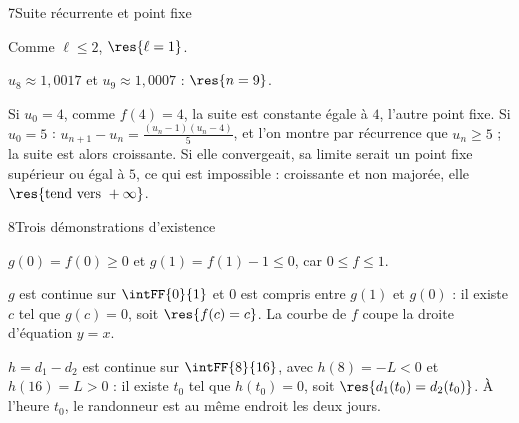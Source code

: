 \begin{corrige}{7}{Suite récurrente et point fixe}
\begin{questions}[start=5]
    Comme $\ell\leq2$, $\res{\ell=1}$.
  \item $u_8\approx1{,}0017$ et $u_9\approx1{,}0007$ : $\res{n=9}$.
  \item Si $u_0=4$, comme $f(4)=4$, la suite est constante égale à $4$, l'autre point fixe. Si $u_0=5$ :
    $u_{n+1}-u_n=\frac{(u_n-1)(u_n-4)}{5}$, et l'on montre par récurrence que $u_n\geq5$ ; la suite est alors croissante.
    Si elle convergeait, sa limite serait un point fixe supérieur ou égal à $5$, ce qui est impossible : croissante et non
    majorée, elle $\res{\text{tend vers }+\infty}$.
\end{questions}
\end{corrige}

\begin{corrige}{8}{Trois démonstrations d'existence}
\noindent
\begin{minipage}[t]{0.56\linewidth}\vspace{0pt}\raggedright
{}
\begin{questions}
  \item $g(0)=f(0)\geq0$ et $g(1)=f(1)-1\leq0$, car $0\leq f\leq1$.
  \item $g$ est continue sur $\intFF{0}{1}$ et $0$ est compris entre $g(1)$ et $g(0)$ : il existe $c$ tel que $g(c)=0$, soit
    $\res{f(c)=c}$. La courbe de $f$ coupe la droite d'équation $y=x$.
\end{questions}
\begin{questions}[resume]
  \item $h=d_1-d_2$ est continue sur $\intFF{8}{16}$, avec $h(8)=-L<0$ et $h(16)=L>0$ : il existe $t_0$ tel que $h(t_0)=0$, soit
    $\res{d_1(t_0)=d_2(t_0)}$. À l'heure $t_0$, le randonneur est au même endroit les deux jours.
\end{questions}
\end{minipage}\hfill
\begin{minipage}[t]{0.4\linewidth}\vspace{0pt}
\centering
{}
\end{minipage}
\end{corrige}
